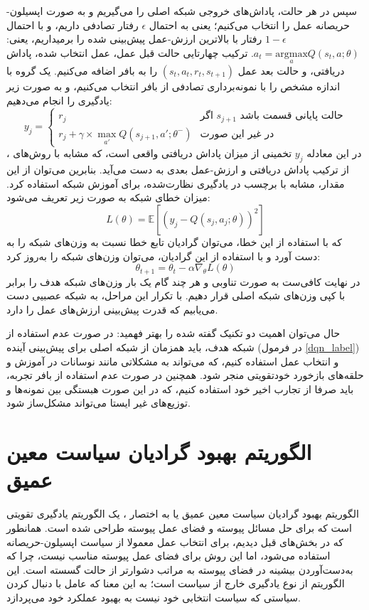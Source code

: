 سپس در هر حالت، پاداش‌های خروجی شبکه اصلی را می‌گیریم و به صورت اپسیلون-حریصانه عمل را انتخاب می‌کنیم؛
یعنی به احتمال $\epsilon$ رفتار تصادفی داریم، 
و با احتمال $1-\epsilon$
رفتار با بالاترین ارزش-عمل پیش‌بینی شده را برمیداریم، یعنی: $a_t = \underset{a}{\mathrm{argmax}} Q(s_t, a; \theta)$.
ترکیب چهارتایی حالت قبل عمل، عمل انتخاب شده، پاداش دریافتی، و حالت بعد عمل $(s_t,a_t,r_t,s_{t+1})$
را به بافر اضافه می‌کنیم.
یک گروه با اندازه مشخص را با نمونه‌برداری تصادفی از بافر انتخاب می‌کنیم، و به صورت زیر یادگیری را انجام می‌دهیم:
\begin{equation}\label{dqn_label}
    y_j = \begin{cases}
        r_j & \text{اگر $s_{j+1}$ حالت پایانی قسمت باشد} \\
        r_j + \gamma \times \max_{a'} Q(s_{j+1}, a'; \theta^-) & \text{در غیر این صورت}
    \end{cases}
\end{equation}
در این معادله $y_j$ تخمینی از میزان پاداش دریافتی واقعی است، که مشابه با روش‌های ، از ترکیب پاداش دریافتی و ارزش-عمل بعدی به دست می‌آید.
بنابرین می‌توان از این مقدار، مشابه با برچسب در یادگیری نظارت‌شده، برای آموزش شبکه استفاده کرد.
میزان خطای شبکه به صورت زیر تعریف می‌شود:
\begin{equation}\label{dqn_loss}
    L(\theta) = \mathbb{E}[(y_j - Q(s_j, a_j; \theta))^2]
\end{equation}
که با استفاده از این خطا، می‌توان گرادیان تابع خطا نسبت به وزن‌های شبکه را به دست آورد و
با استفاده از این گرادیان، می‌توان وزن‌های شبکه را به‌روز کرد:
\begin{equation}\label{dqn_update}
    \theta_{t+1} = \theta_t - \alpha \nabla_\theta L(\theta)
\end{equation}
در نهایت کافی‌ست به صورت تناوبی و هر چند گام یک بار وزن‌های شبکه هدف را برابر با کپی وزن‌های شبکه اصلی قرار دهیم. با تکرار این مراحل، به شبکه عصبیی دست می‌یابیم که قدرت پیش‌بینی ارزش‌های عمل را دارد.


حال می‌توان اهمیت دو تکنیک گفته شده را بهتر فهمید: در صورت عدم استفاده از شبکه هدف، باید همزمان از شبکه اصلی برای پیش‌بینی آینده (در فرمول \ref{dqn_label}) و انتخاب عمل استفاده کنیم، که می‌تواند به مشکلاتی مانند نوسانات در آموزش و حلقه‌های بازخورد خودتقویتی منجر شود.
همچنین در صورت عدم استفاده از بافر تجربه، باید صرفا از تجارب اخیر خود استفاده کنیم، که در این صورت هبستگی بین نمونه‌ها و توزیع‌های غیر ایستا می‌تواند مشکل‌ساز شود.
\section{الگوریتم بهبود گرادیان سیاست معین عمیق}
الگوریتم بهبود گرادیان سیاست معین عمیق  یا به اختصار ، یک الگوریتم یادگیری تقویتی است که برای حل مسائل پیوسته و فضای عمل پیوسته طراحی شده است.
همانطور که در بخش‌های قبل دیدیم، برای انتخاب عمل معمولا از سیاست اپسیلون-حریصانه استفاده می‌شود، اما این روش برای فضای عمل پیوسته مناسب نیست، چرا که به‌دست‌آوردن بیشینه در فضای پیوسته به مراتب دشوار‌تر از حالت گسسته است.
این الگوریتم از نوع یادگیری خارج از سیاست است؛ به این معنا که عامل با دنبال کردن سیاستی که سیاست انتخابی خود نیست به بهبود عملکرد خود می‌پردازد.

